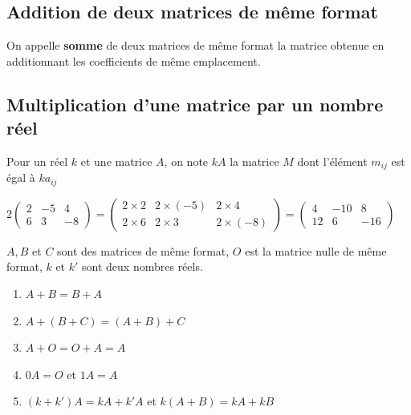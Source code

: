 \documentclass[french]{book}
\begin{document}
 \subsection{Addition de deux matrices de même format}
   
    On appelle \textbf{somme } de deux matrices de même format la matrice obtenue en additionnant les coefficients de même emplacement.
   
\subsection{Multiplication d'une matrice par un nombre réel}
   
    Pour un réel $k$ et une matrice $A$, on note $kA$ la matrice $M$ dont l'élément $m_{ij}$ est égal à $ka_{ij}$
   
\begin{exemple}
   
   $2\begin{pmatrix}
    2 & -5 & 4 \\ 
   6 & 3 & -8
   \end{pmatrix} = \begin{pmatrix}
    2\times 2 & 2\times (-5) &2\times 4 \\ 
   2\times 6 & 2\times 3 & 2 \times (-8)
   \end{pmatrix}=\begin{pmatrix}
    4 & -10 & 8 \\ 
   12 & 6 & -16
   \end{pmatrix} $ 
   
  \end{exemple}
   
\begin{prop}
   
    $A,B$ et $C$ sont des matrices de même format, $O$ est la matrice nulle de même format, $k$ et $k'$ sont deux nombres réels.


   
   \begin{enumerate}
   \item $A+B=B+A$
   
   \item $A+(B+C)=(A+B)+C$
   
   \item $A+O=O+A=A$
   
   \item $0A=O$ et $1A=A$
   
   \item $(k+k')A=kA+k'A$ et $k(A+B)=kA+kB$ 
   \end{enumerate}
\end{prop}   
\end{document}
